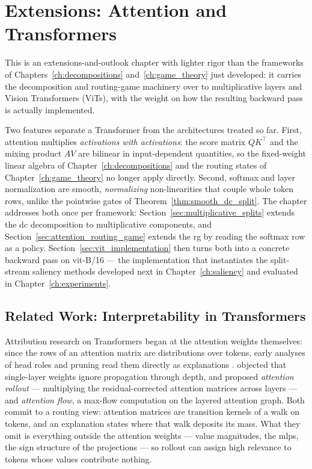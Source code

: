 \chapter{Extensions: Attention and Transformers}\label{ch:transformers}

This is an extensions-and-outlook chapter with lighter rigor than the frameworks of Chapters~\ref{ch:decompositions} and~\ref{ch:game_theory} just developed: it carries the decomposition and routing-game machinery over to multiplicative layers and Vision Transformers (ViTs), with the weight on how the resulting backward pass is actually implemented.

Two features separate a Transformer \parencite{Vaswani2017} from the architectures treated so far. First, attention multiplies \emph{activations with activations}: the score matrix $QK^\top$ and the mixing product $AV$ are bilinear in input-dependent quantities, so the fixed-weight linear algebra of Chapter~\ref{ch:decompositions} and the routing states of Chapter~\ref{ch:game_theory} no longer apply directly. Second, softmax and layer normalization are smooth, \emph{normalizing} non-linearities that couple whole token rows, unlike the pointwise gates of Theorem~\ref{thm:smooth_dc_split}. The chapter addresses both once per framework: Section~\ref{sec:multiplicative_splits} extends the \ac{dc} decomposition to multiplicative components, and Section~\ref{sec:attention_routing_game} extends the \ac{rg} by reading the softmax row as a policy. Section~\ref{sec:vit_implementation} then turns both into a concrete backward pass on \ac{vit}-B/16 --- the implementation that instantiates the split-stream saliency methods developed next in Chapter~\ref{ch:saliency} and evaluated in Chapter~\ref{ch:experiments}.

\section{Related Work: Interpretability in Transformers}\label{sec:related_work_transformers}

Attribution research on Transformers began at the attention weights themselves: since the rows of an attention matrix are distributions over tokens, early analyses of head roles and pruning read them directly as explanations \parencite{Voita2019}. \textcite{Abnar2020attention} objected that single-layer weights ignore propagation through depth, and proposed \emph{attention rollout} --- multiplying the residual-corrected attention matrices across layers --- and \emph{attention flow}, a max-flow computation on the layered attention graph. Both commit to a routing view: attention matrices are transition kernels of a walk on tokens, and an explanation states where that walk deposits its mass. What they omit is everything outside the attention weights --- value magnitudes, the \acp{mlp}, the sign structure of the projections --- so rollout can assign high relevance to tokens whose values contribute nothing.


